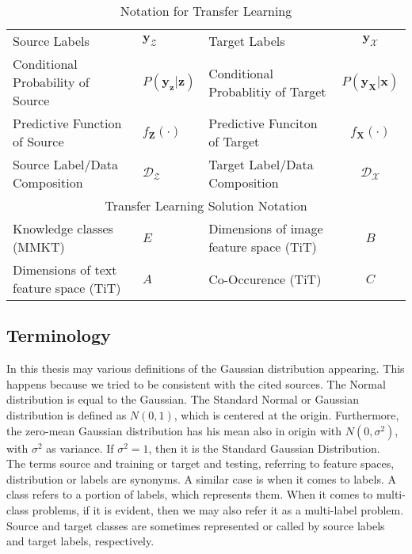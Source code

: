 \begin{table}[]
{\begin{tabular}{@{}lclc@{}}
		Source Labels                          & \multicolumn{1}{l|}{$\mathbf{y}_\mathcal{Z}$}      & Target Labels                                         & $\mathbf{y}_\mathcal{X}$      \\
		Conditional Probability of Source      & \multicolumn{1}{l|}{$P(\mathbf{y}_\mathbf{z}\vert\mathbf{z})$} & Conditional Probablitiy of Target                     & $P(\mathbf{y}_\mathbf{X}\vert\mathbf{x})$ \\
		Predictive Function of Source          & \multicolumn{1}{l|}{$f_\mathbf{Z}(\cdot)$}    & Predictive Funciton of Target                         & $f_\mathbf{X}(\cdot)$    \\
		Source Label/Data Composition          & \multicolumn{1}{l|}{$\mathcal{D_Z}$}      & Target Label/Data Composition                         & $\mathcal{D_X}$        \\ \midrule
		\multicolumn{4}{c}{Transfer Learning Solution Notation}                                                                                 \\ \midrule
		Knowledge classes (MMKT)               & \multicolumn{1}{l|}{$E$}       & Dimensions of image feature space (TiT)               & $B$       \\
		Dimensions of text feature space (TiT) & \multicolumn{1}{l|}{$A$}       & Co-Occurence (TiT)                                    & $C$       \\ \bottomrule
	\end{tabular}}
	\caption{Notation for Transfer Learning\label{ATableNotation}}

\end{table}
\subsection{Terminology}
In this thesis may various definitions of the Gaussian distribution appearing.
This happens because we tried to be consistent with the cited sources.
The Normal distribution is equal to the Gaussian.
The Standard Normal or Gaussian distribution is defined as $N(0,1)$, which is centered at the origin.
Furthermore, the zero-mean Gaussian distribution has his mean also in origin with $N(0,\sigma^2)$, with $\sigma^2$ as variance.
If $\sigma^2=1$, then it is the Standard Gaussian Distribution.\\
The terms source and training or target and testing, referring to feature spaces, distribution or labels are synonyms.
A similar case is when it comes to labels. A class refers to a portion of labels, which represents them. 
When it comes to multi-class problems, if it is evident, then we may also refer it as a multi-label problem.
Source and target classes are sometimes represented or called by source labels and target labels, respectively.
\clearpage
\newpage
